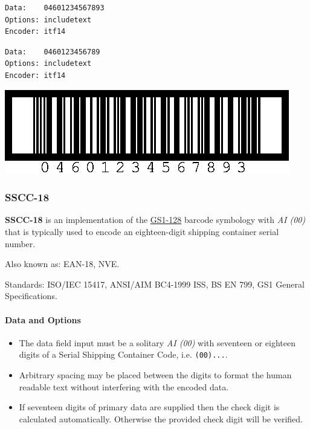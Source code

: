 \begin{verbatim}
Data:    04601234567893
Options: includetext
Encoder: itf14
\end{verbatim}

\begin{verbatim}
Data:    0460123456789
Options: includetext
Encoder: itf14
\end{verbatim}

\includegraphics{images/itf-14-1.eps}

\hypertarget{sscc-18}{%
\subsubsection{SSCC-18}\label{sscc-18}}

\textbf{SSCC-18} is an implementation of the
\protect\hyperlink{gs1-128}{GS1-128} barcode symbology with \emph{AI
(00)} that is typically used to encode an eighteen-digit shipping
container serial number.

Also known as: EAN-18, NVE.

Standards: ISO/IEC 15417, ANSI/AIM BC4-1999 ISS, BS EN 799, GS1 General
Specifications.

\hypertarget{data-and-options-27}{%
\paragraph{Data and Options}\label{data-and-options-27}}

\begin{itemize}
\tightlist
\item
  The data field input must be a solitary \emph{AI (00)} with seventeen
  or eighteen digits of a Serial Shipping Container Code, i.e.
  \texttt{(00)...}.
\item
  Arbitrary spacing may be placed between the digits to format the human
  readable text without interfering with the encoded data.
\item
  If seventeen digits of primary data are supplied then the check digit
  is calculated automatically. Otherwise the provided check digit will
  be verified.
\end{itemize}

